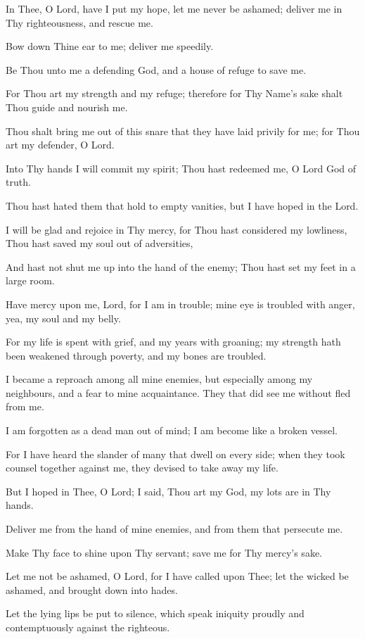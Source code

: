 In Thee, O Lord, have I put my hope, let me never be ashamed; deliver me in Thy righteousness, and rescue me.

Bow down Thine ear to me; deliver me speedily.

Be Thou unto me a defending God, and a house of refuge to save me.

For Thou art my strength and my refuge; therefore for Thy Name's sake shalt Thou guide and nourish me.

Thou shalt bring me out of this snare that they have laid privily for me; for Thou art my defender, O Lord.

Into Thy hands I will commit my spirit; Thou hast redeemed me, O Lord God of truth.

Thou hast hated them that hold to empty vanities, but I have hoped in the Lord.

I will be glad and rejoice in Thy mercy, for Thou hast considered my lowliness, Thou hast saved my soul out of adversities,

And hast not shut me up into the hand of the enemy; Thou hast set my feet in a large room.

Have mercy upon me, Lord, for I am in trouble; mine eye is troubled with anger, yea, my soul and my belly.

For my life is spent with grief, and my years with groaning; my strength hath been weakened through poverty, and my bones are
troubled.

I became a reproach among all mine enemies, but especially among my neighbours, and a fear to mine acquaintance. They that did see me without fled from me.

I am forgotten as a dead man out of mind; I am become like a broken vessel.

For I have heard the slander of many that dwell on every side; when they took counsel together against me, they devised to take away my life.

But I hoped in Thee, O Lord; I said, Thou art my God, my lots are in Thy hands.

Deliver me from the hand of mine enemies, and from them that persecute me.

Make Thy face to shine upon Thy servant; save me for Thy mercy’s sake.

Let me not be ashamed, O Lord, for I have called upon Thee; let the wicked be ashamed, and brought down into hades.

Let the lying lips be put to silence, which speak iniquity proudly and contemptuously against the righteous.

